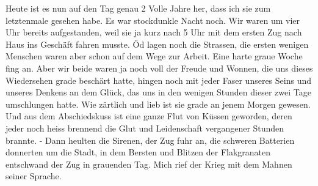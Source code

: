 \def\day{9. Februar 1943}
\mktitle

Heute ist es nun auf den Tag genau 2 Volle Jahre her, dass ich sie zum letztenmale gesehen habe.
Es war stockdunkle Nacht noch.
Wir waren um vier Uhr bereits aufgestanden, weil sie ja kurz nach 5 Uhr mit dem ersten Zug nach Haus ins Gesch\"{a}ft fahren musste.
\"{O}d lagen noch die Strassen, die ersten wenigen Menschen waren aber schon auf dem Wege zur Arbeit.
Eine harte graue Woche fing an.
Aber wir beide waren ja noch voll der Freude und Wonnen, die uns dieses Wiedersehen grade besch\"{a}rt hatte, hingen noch mit jeder Faser unseres Seins und unseres Denkens an dem Gl\"{u}ck, das uns in den wenigen Stunden dieser zwei Tage umschlungen hatte.
Wie z\"{a}rtlich und lieb ist sie grade an jenem Morgen gewesen.
Und aus dem Abschiedskuss ist eine ganze Flut von K\"{u}ssen geworden, deren jeder noch heiss brennend die Glut und Leidenschaft vergangener Stunden brannte.
- Dann heulten die Sirenen, der Zug fuhr an, die schweren Batterien donnerten um die Stadt, in dem Bersten und Blitzen der Flakgranaten entschwand der Zug in grauenden Tag.
Mich rief der Krieg mit dem Mahnen seiner Sprache.

\clearpage
